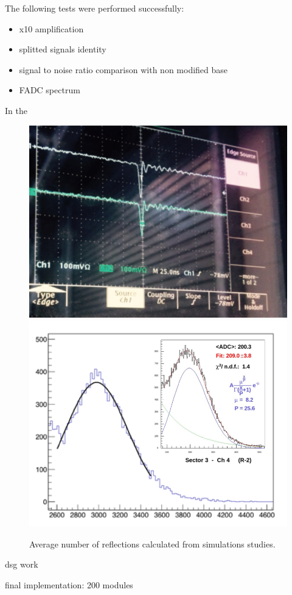 The following tests were performed successfully:
\begin{itemize}
	\item x10 amplification
	\item splitted signals identity
	\item signal to noise ratio comparison with non modified base
	\item FADC spectrum
\end{itemize}

In  the




\begin{figure}
	\centering
	\includegraphics[width=0.87\columnwidth,keepaspectratio]{img/doubleSignal.png}
	\includegraphics[width=0.97\columnwidth,keepaspectratio]{img/fadcOutput.png}
	\caption{Average number of reflections calculated from simulations studies.}
	\label{fig:dividerTests}
\end{figure}

dsg work

final implementation: 200 modules

